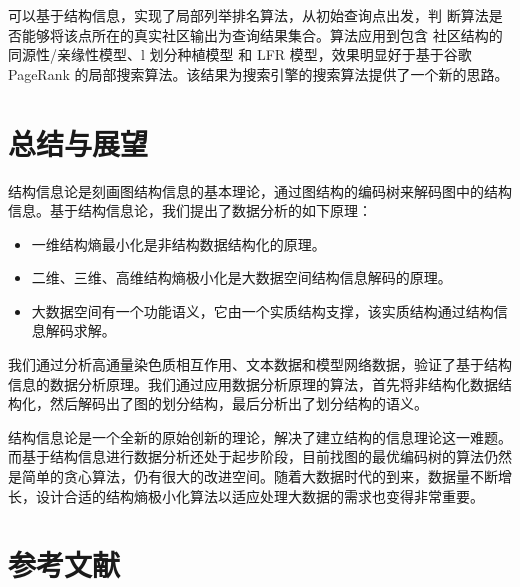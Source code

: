 \documentclass[a4paper]{apa6}
\begin{document}
可以基于结构信息，实现了局部列举排名算法，从初始查询点出发，判 断算法是否能够将该点所在的真实社区输出为查询结果集合。算法应用到包含 社区结构的同源性/亲缘性模型、l 划分种植模型 和 LFR 模型，效果明显好于基于谷歌 PageRank 的局部搜索算法。该结果为搜索引擎的搜索算法提供了一个新的思路。

\section{总结与展望}
结构信息论是刻画图结构信息的基本理论，通过图结构的编码树来解码图中的结构信息。基于结构信息论，我们提出了数据分析的如下原理：
\begin{itemize}
    \item 一维结构熵最小化是非结构数据结构化的原理。
    \item 二维、三维、高维结构熵极小化是大数据空间结构信息解码的原理。
    \item 大数据空间有一个功能语义，它由一个实质结构支撑，该实质结构通过结构信息解码求解。
\end{itemize}

我们通过分析高通量染色质相互作用、文本数据和模型网络数据，验证了基于结构信息的数据分析原理。我们通过应用数据分析原理的算法，首先将非结构化数据结构化，然后解码出了图的划分结构，最后分析出了划分结构的语义。

结构信息论是一个全新的原始创新的理论，解决了建立结构的信息理论这一难题。而基于结构信息进行数据分析还处于起步阶段，目前找图的最优编码树的算法仍然是简单的贪心算法，仍有很大的改进空间。随着大数据时代的到来，数据量不断增长，设计合适的结构熵极小化算法以适应处理大数据的需求也变得非常重要。

\section{参考文献}
\label{sec:org9101910}


\end{document}
